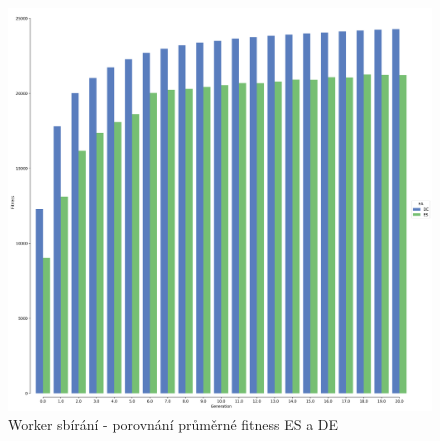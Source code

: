 	\begin{figure}[t]\centering       
		\includegraphics[width=\columnwidth]{../img/WoodMap/DEvsES/PickUp.png}
		\caption{ Worker sbírání - porovnání průměrné fitness ES a DE}
		\label{obr04:PickupESvsDE}
	\end{figure}
